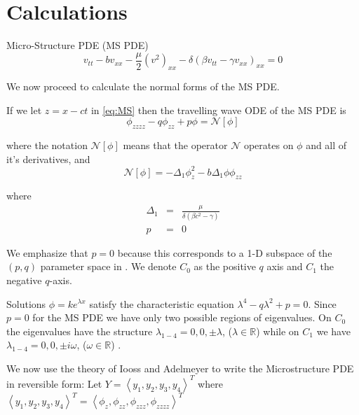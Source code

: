 \section{Calculations}

Micro-Structure PDE (MS PDE) \cite{Roy1}
\begin{equation}\label{eq:MS}
v_{tt} - b v_{xx} - \frac{\mu}{2} \left( v^2 \right)_{xx} - \delta \left( \beta v_{tt} - \gamma v_{xx}\right)_{xx} = 0 
\end{equation}

We now proceed to calculate the normal forms of the MS PDE.

If we let $z= x - c t$  in \eqref{eq:MS} then the travelling wave 
ODE of the MS PDE is
\begin{equation} \label{eq:ode}
\phi_{zzzz} - q \phi_{zz} + p \phi = \mathcal{N}[\phi]
\end{equation}

where the notation $\mathcal{N[\phi]}$ means that the operator $\mathcal{N}$ operates on $\phi$ and all of it's derivatives, and 
\begin{equation}
\mathcal{N}\left[\phi\right] = -\Delta_1 \phi_z^2 - b \Delta_1 \phi \phi_{zz}
\end{equation}

where 
\begin{subequations}
\begin{eqnarray}
\Delta_1 &=& \frac{\mu}{ \delta\left( \beta c^2 - \gamma\right) } \\
p &=& 0 
\end{eqnarray}
\end{subequations}

We emphasize that $p=0$ because this corresponds to a 1-D subspace of the $(p,q)$ parameter space in \cite{Roy1}. We denote $C_0$ as the positive $q$ axis and $C_1$ the negative $q$-axis. 

Solutions $\phi = k e^{\lambda x}$ satisfy the characteristic equation $\lambda^4 - q \lambda^2 + p = 0 $. Since $p=0$ for the MS PDE we have only two possible regions of eigenvalues. On $C_0$ the eigenvalues have the structure 
$\lambda_{1-4} = 0,0,\pm \lambda$, ($\lambda \in \mathbb{R}$) while on $C_1$ we have 
$\lambda_{1-4} = 0,0,\pm i \omega $, ($\omega \in \mathbb{R} $) .



We now use the theory of Iooss and Adelmeyer \cite{IA} to write the Microstructure PDE in reversible form:
Let $Y=\left<y_1,y_2,y_3,y_4\right>^T$ where $\left<y_1,y_2,y_3,y_4\right>^T = \left<\phi_z,\phi_{zz}, \phi_{zzz}, \phi_{zzzz} \right>^T $

